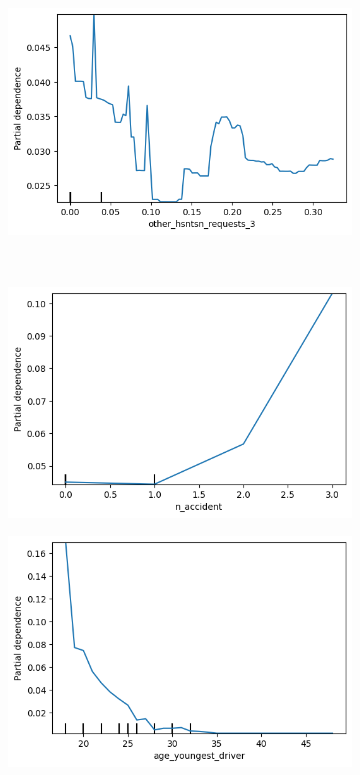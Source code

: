 \documentclass[12pt,titlepage]{article}
\begin{document}
\begin{figure}
\begin{subfigure}{.55\textwidth}
    \end{subfigure}%
    \begin{subfigure}{.55\textwidth}
        \centering
        \includegraphics[width=1\linewidth]{pdp_other_hsntsn_requests_3.png}
    \end{subfigure} \\
    \begin{subfigure}{.55\textwidth}
        \centering
        \includegraphics[width=1\linewidth]{pdp_n_accident.png}
    \end{subfigure}%
    \begin{subfigure}{.55\textwidth}
        \centering
        \includegraphics[width=1\linewidth]{pdp_age_youngest_driver.png}

\end{subfigure}
\end{figure}
\end{document}

